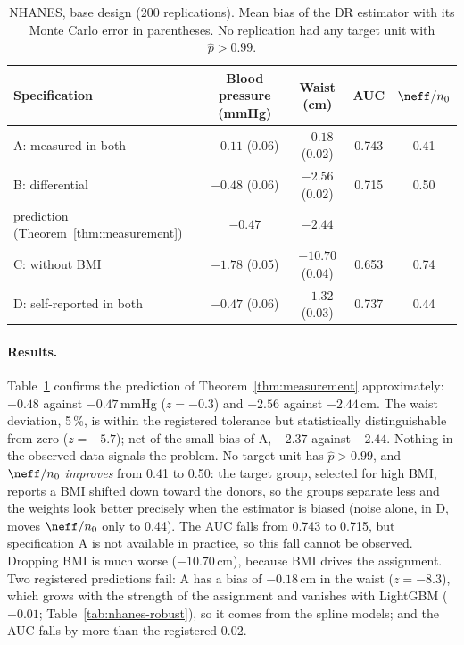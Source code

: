 \begin{table}[ht]
\centering
\caption{NHANES, base design (200 replications). Mean bias of the DR estimator with its Monte Carlo error in parentheses. No replication had any target unit with $\hat p>0.99$.}\label{tab:nhanes}
\begin{tabular}{@{}lcccc@{}}
\toprule
Specification & Blood pressure (mmHg) & Waist (cm) & AUC & $\neff/n_0$ \\
\midrule
A: measured in both & $-0.11$ (0.06) & $-0.18$ (0.02) & 0.743 & 0.41 \\
B: differential & $-0.48$ (0.06) & $-2.56$ (0.02) & 0.715 & 0.50 \\
\quad prediction (Theorem~\ref{thm:measurement}) & $-0.47$ & $-2.44$ & & \\
C: without BMI & $-1.78$ (0.05) & $-10.70$ (0.04) & 0.653 & 0.74 \\
D: self-reported in both & $-0.47$ (0.06) & $-1.32$ (0.03) & 0.737 & 0.44 \\
\bottomrule
\end{tabular}
\end{table}

\paragraph{Results.} Table~\ref{tab:nhanes} confirms the prediction of Theorem~\ref{thm:measurement} approximately: $-0.48$ against $-0.47$\,mmHg ($z=-0.3$) and $-2.56$ against $-2.44$\,cm. The waist deviation, 5\,\%, is within the registered tolerance but statistically distinguishable from zero ($z=-5.7$); net of the small bias of A, $-2.37$ against $-2.44$. Nothing in the observed data signals the problem. No target unit has $\hat p>0.99$, and $\neff/n_0$ \emph{improves} from 0.41 to 0.50: the target group, selected for high BMI, reports a BMI shifted down toward the donors, so the groups separate less and the weights look better precisely when the estimator is biased (noise alone, in D, moves $\neff/n_0$ only to 0.44). The AUC falls from 0.743 to 0.715, but specification A is not available in practice, so this fall cannot be observed. Dropping BMI is much worse ($-10.70$\,cm), because BMI drives the assignment. Two registered predictions fail: A has a bias of $-0.18$\,cm in the waist ($z=-8.3$), which grows with the strength of the assignment and vanishes with LightGBM ($-0.01$; Table~\ref{tab:nhanes-robust}), so it comes from the spline models; and the AUC falls by more than the registered 0.02.

